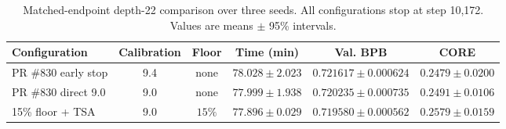 \begin{table}[t]
\centering
\small
\setlength{\tabcolsep}{3pt}
\caption{Matched-endpoint depth-22 comparison over three seeds. All configurations stop at step 10,172. Values are means $\pm$ 95\% intervals.}
\label{tab:d22-matched}
\begin{tabular}{lccccc}
\toprule
Configuration & Calibration & Floor & Time (min) & Val. BPB & CORE \\
\midrule
PR \#830 early stop & 9.4 & none & $78.028 \pm 2.023$ & $0.721617 \pm 0.000624$ & $0.2479 \pm 0.0200$ \\
PR \#830 direct 9.0 & 9.0 & none & $77.999 \pm 1.938$ & $0.720235 \pm 0.000735$ & $0.2491 \pm 0.0106$ \\
15\% floor + TSA & 9.0 & $15\%$ & $77.896 \pm 0.029$ & $0.719580 \pm 0.000562$ & $0.2579 \pm 0.0159$ \\
\bottomrule
\end{tabular}
\end{table}
